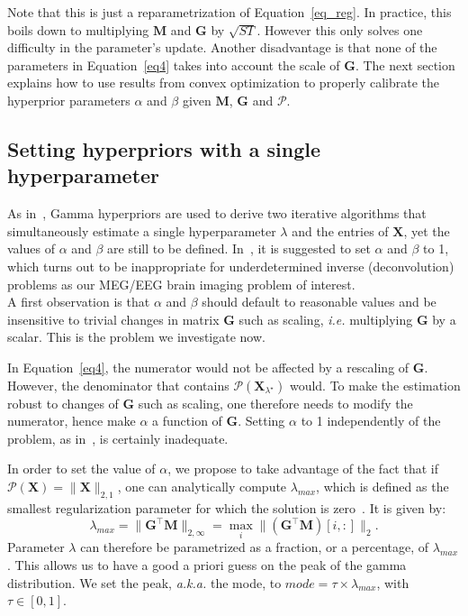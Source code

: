 Note that this is just a reparametrization of Equation~\eqref{eq_reg}. In practice, this boils down to multiplying $\mathbf{M}$ and $\mathbf{G}$ by $\sqrt{ST}$. However this only solves one difficulty in the parameter's update. Another disadvantage is that none of the parameters in Equation~\eqref{eq4} takes into account the scale of $\mathbf{G}$. The next section explains how to use results from convex optimization to properly calibrate the hyperprior parameters $\alpha$ and $\beta$ given $\mathbf{M}$, $\mathbf{G}$ and $\mathcal{P}$.

\subsection{Setting hyperpriors with a single hyperparameter}
As in~\cite{Figueiredo}, Gamma hyperpriors are used to derive two iterative algorithms that simultaneously estimate a single hyperparameter $\lambda$ and the entries of $\mathbf{X}$, yet the values of $\alpha$ and $\beta$ are still to be defined.
In~\cite{Figueiredo}, it is suggested to set $\alpha$ and $\beta$ to 1, which turns out to be inappropriate for underdetermined inverse (deconvolution) problems as our MEG/EEG brain imaging problem of interest.\\

A first observation is that $\alpha$ and $\beta$ should default to reasonable values and be insensitive to trivial changes in matrix $\mathbf{G}$ such as scaling, \textit{i.e.} multiplying $\mathbf{G}$ by a scalar. This is the problem we investigate now.

In Equation~\eqref{eq4}, the numerator would not be affected by a rescaling of $\mathbf{G}$. However, the denominator that contains $\mathcal{P}(\mathbf{X}_{\lambda^\star})$ would. To make the estimation robust to changes of $\mathbf{G}$ such as scaling, one therefore needs to modify the numerator, hence make $\alpha$ a function of $\mathbf{G}$. Setting $\alpha$ to 1 independently of the problem, as in~\cite{Figueiredo}, is certainly inadequate.

In order to set the value of $\alpha$, we propose to take advantage of the fact that if $\mathcal{P}(\mathbf{X})=\|\mathbf{X}\|_{2,1}$, one can analytically compute $\lambda_{max}$, which is defined as the smallest regularization parameter for which the solution is zero~\cite{bach2012optimization}. It is given by:
\begin{equation}
\lambda_{max} = \|\mathbf{G}^\top\mathbf{M}\|_{2,\infty}=\max_i \|(\mathbf{G}^\top\mathbf{M})[i, :]\|_2.
\end{equation}
Parameter $\lambda$ can therefore be parametrized as a fraction, or a percentage, of $\lambda_{max}$.
This allows us to have a good a priori guess on the peak of the gamma distribution. We set the peak, \textit{a.k.a.} the mode, to $mode=\tau\times\lambda_{max}$, with $\tau\in[0,1]$.
\\

